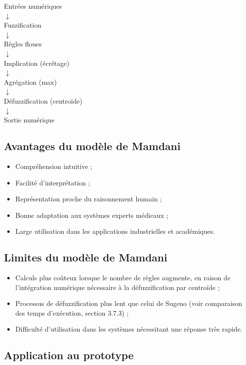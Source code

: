 \documentclass[a4paper,12pt]{report} %
\begin{document}
\begin{center}
Entrées numériques \\
$\downarrow$ \\
Fuzzification \\
$\downarrow$ \\
Règles floues \\
$\downarrow$ \\
Implication (écrêtage) \\
$\downarrow$ \\
Agrégation (max) \\
$\downarrow$ \\
Défuzzification (centroïde) \\
$\downarrow$ \\
Sortie numérique
\end{center}

\subsection{Avantages du modèle de Mamdani}

\begin{itemize}
\item Compréhension intuitive ;
\item Facilité d'interprétation ;
\item Représentation proche du raisonnement humain ;
\item Bonne adaptation aux systèmes experts médicaux ;
\item Large utilisation dans les applications industrielles et académiques.
\end{itemize}

\subsection{Limites du modèle de Mamdani}

\begin{itemize}
\item Calculs plus coûteux lorsque le nombre de règles augmente, en raison de l'intégration numérique nécessaire à la défuzzification par centroïde ;
\item Processus de défuzzification plus lent que celui de Sugeno (voir comparaison des temps d'exécution, section 3.7.3) ;
\item Difficulté d'utilisation dans les systèmes nécessitant une réponse très rapide.
\end{itemize}

\subsection{Application au prototype}
\end{document}
